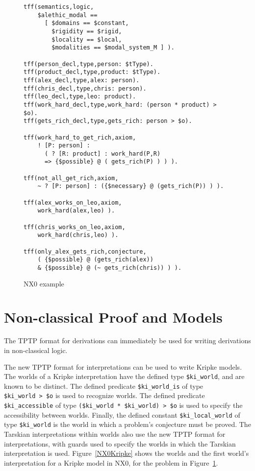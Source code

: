 \documentclass[runningheads]{llncs}
\begin{document}
\begin{figure}[htbp]
\small
{}
\begin{verbatim}
tff(semantics,logic,
    $alethic_modal ==
      [ $domains == $constant,
        $rigidity == $rigid,
        $locality == $local,
        $modalities == $modal_system_M ] ).

tff(person_decl,type,person: $tType).
tff(product_decl,type,product: $tType).
tff(alex_decl,type,alex: person).
tff(chris_decl,type,chris: person).
tff(leo_decl,type,leo: product).
tff(work_hard_decl,type,work_hard: (person * product) > $o).
tff(gets_rich_decl,type,gets_rich: person > $o).

tff(work_hard_to_get_rich,axiom,
    ! [P: person] :
      ( ? [R: product] : work_hard(P,R)
      => {$possible} @ ( gets_rich(P) ) ) ).

tff(not_all_get_rich,axiom,
    ~ ? [P: person] : ({$necessary} @ (gets_rich(P)) ) ).

tff(alex_works_on_leo,axiom,
    work_hard(alex,leo) ).

tff(chris_works_on_leo,axiom,
    work_hard(chris,leo) ).

tff(only_alex_gets_rich,conjecture,
    ( {$possible} @ (gets_rich(alex)) 
    & {$possible} @ (~ gets_rich(chris)) ) ).
\end{verbatim}
\caption{NX0 example}
\label{NX0Example}
\end{figure}

\section{Non-classical Proof and Models}
\label{ProofsModels}

The TPTP format for derivations \cite{SS+06} can immediately be used for writing derivations in
non-classical logic.

The new TPTP format for interpretations \cite{SS+23-LPAR} can be used to write Kripke models.
The worlds of a Kripke interpretation have the defined type {\tt \$ki\_world}, and are known to 
be distinct.
The defined predicate {\tt \$ki\_world\_is} of type {\tt \$ki\_world~>~\$o} is used to recognize 
worlds.
The defined predicate {\tt \$ki\_access\-ible} of type {\tt (\$ki\_world~*~\$ki\_world)~>~\$o} is
used to specify the accessibility between worlds.
Finally, the defined constant {\tt \$ki\_local\_world} of type {\tt \$ki\_world} is the world in
which a problem's conjecture must be proved. 
The Tarskian interpretations within worlds also use the new TPTP format for interpretations,
with guards used to specify the worlds in which the Tarskian interpretation is used.
Figure~\ref{NX0Kripke} shows the worlds and the first world's interpretation for a Kripke
model in NX0, for the problem in Figure~\ref{NX0Example}.
\end{document}
